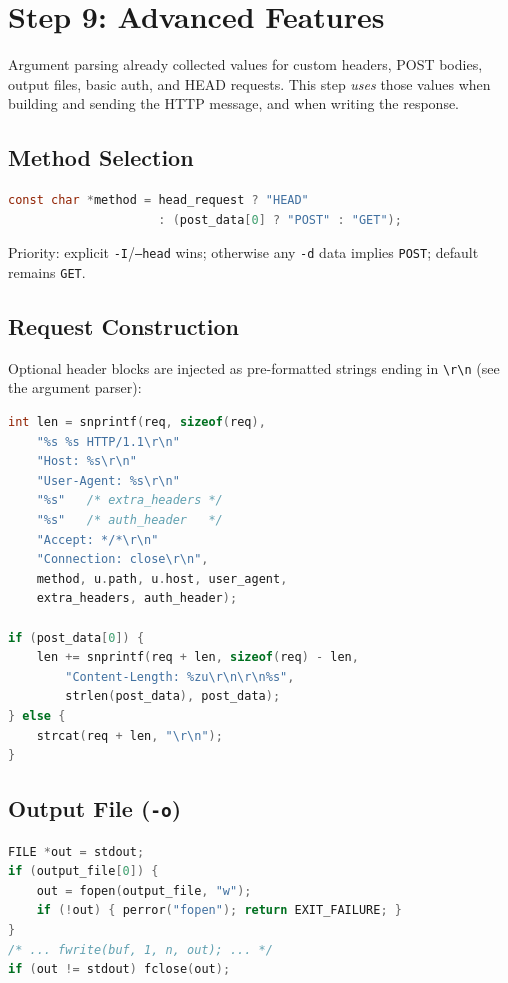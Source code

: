 \section{Step 9: Advanced Features}

Argument parsing already collected values for custom headers, POST bodies,
output files, basic auth, and HEAD requests. This step \emph{uses} those
values when building and sending the HTTP message, and when writing the
response.

\subsection{Method Selection}

\begin{lstlisting}[style=snippet,language=C]
const char *method = head_request ? "HEAD"
                     : (post_data[0] ? "POST" : "GET");
\end{lstlisting}

Priority: explicit \texttt{-I}/\texttt{--head} wins; otherwise any
\texttt{-d} data implies \texttt{POST}; default remains \texttt{GET}.

\subsection{Request Construction}

Optional header blocks are injected as pre-formatted strings ending in
\texttt{\textbackslash r\textbackslash n} (see the argument parser):

\begin{lstlisting}[style=snippet,language=C]
int len = snprintf(req, sizeof(req),
    "%s %s HTTP/1.1\r\n"
    "Host: %s\r\n"
    "User-Agent: %s\r\n"
    "%s"   /* extra_headers */
    "%s"   /* auth_header   */
    "Accept: */*\r\n"
    "Connection: close\r\n",
    method, u.path, u.host, user_agent,
    extra_headers, auth_header);

if (post_data[0]) {
    len += snprintf(req + len, sizeof(req) - len,
        "Content-Length: %zu\r\n\r\n%s",
        strlen(post_data), post_data);
} else {
    strcat(req + len, "\r\n");
}
\end{lstlisting}

\subsection{Output File (\texttt{-o})}

\begin{lstlisting}[style=snippet,language=C]
FILE *out = stdout;
if (output_file[0]) {
    out = fopen(output_file, "w");
    if (!out) { perror("fopen"); return EXIT_FAILURE; }
}
/* ... fwrite(buf, 1, n, out); ... */
if (out != stdout) fclose(out);
\end{lstlisting}

